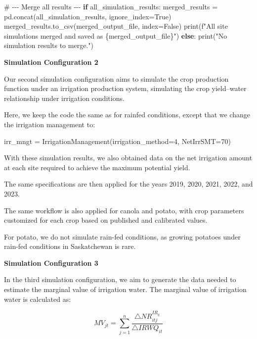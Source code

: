 \documentclass[
  letterpaper,
  DIV=11,
  numbers=noendperiod]{scrartcl}
\newenvironment{Shaded}{\begin{snugshade}}{\end{snugshade}}
\newcommand{\BuiltInTok}[1]{\textcolor[rgb]{0.00,0.23,0.31}{#1}}
\newcommand{\CommentTok}[1]{\textcolor[rgb]{0.37,0.37,0.37}{#1}}
\newcommand{\ControlFlowTok}[1]{\textcolor[rgb]{0.00,0.23,0.31}{\textbf{#1}}}
\newcommand{\NormalTok}[1]{\textcolor[rgb]{0.00,0.23,0.31}{#1}}
\newcommand{\OperatorTok}[1]{\textcolor[rgb]{0.37,0.37,0.37}{#1}}
\newcommand{\SpecialCharTok}[1]{\textcolor[rgb]{0.37,0.37,0.37}{#1}}
\newcommand{\SpecialStringTok}[1]{\textcolor[rgb]{0.13,0.47,0.30}{#1}}
\newcommand{\StringTok}[1]{\textcolor[rgb]{0.13,0.47,0.30}{#1}}
\newcommand{\VariableTok}[1]{\textcolor[rgb]{0.07,0.07,0.07}{#1}}
\begin{document}
\begin{Shaded}
\begin{Highlighting}[]
\CommentTok{\# {-}{-}{-} Merge all results {-}{-}{-}}
\ControlFlowTok{if}\NormalTok{ all\_simulation\_results:}
\NormalTok{    merged\_results }\OperatorTok{=}\NormalTok{ pd.concat(all\_simulation\_results, ignore\_index}\OperatorTok{=}\VariableTok{True}\NormalTok{)}
\NormalTok{    merged\_results.to\_csv(merged\_output\_file, index}\OperatorTok{=}\VariableTok{False}\NormalTok{)}
    \BuiltInTok{print}\NormalTok{(}\SpecialStringTok{f"All site simulations merged and saved as }\SpecialCharTok{\{}\NormalTok{merged\_output\_file}\SpecialCharTok{\}}\SpecialStringTok{"}\NormalTok{)}
\ControlFlowTok{else}\NormalTok{:}
    \BuiltInTok{print}\NormalTok{(}\StringTok{"No simulation results to merge."}\NormalTok{)}
\end{Highlighting}
\end{Shaded}

\textbf{Simulation Configuration 2}

Our second simulation configuration aims to simulate the crop production
function under an irrigation production system, simulating the crop
yield--water relationship under irrigation conditions.

Here, we keep the code the same as for rainfed conditions, except that
we change the irrigation management to:

irr\_mngt = IrrigationManagement(irrigation\_method=4, NetIrrSMT=70)

With these simulation results, we also obtained data on the net
irrigation amount at each site required to achieve the maximum potential
yield.

The same specifications are then applied for the years 2019, 2020, 2021,
2022, and 2023.

The same workflow is also applied for canola and potato, with crop
parameters customized for each crop based on published and calibrated
values.

For potato, we do not simulate rain-fed conditions, as growing potatoes
under rain-fed conditions in Saskatchewan is rare.

\textbf{Simulation Configuration 3}

In the third simulation configuration, we aim to generate the data
needed to estimate the marginal value of irrigation water. The marginal
value of irrigation water is calculated as:

\begin{equation}
    MV_{jt}=\sum_{j=1}^{n} \frac{\triangle NR^{IR_q}_{itj}}{{\triangle IRWQ_{it}}}
    \label{equation2}
\end{equation}
\end{document}
